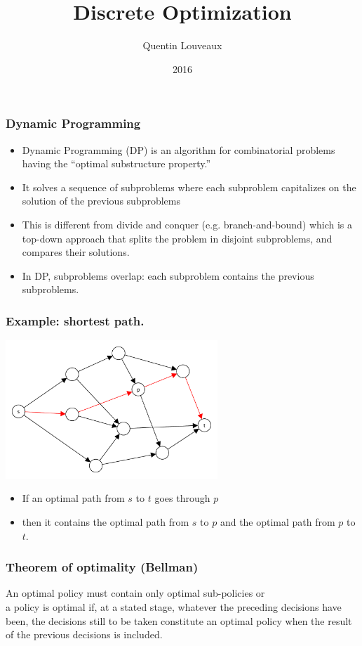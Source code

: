 \documentclass[10pt,handout]{beamer}
\title{Discrete Optimization}
\author{Quentin
Louveaux}
\date{2016}
\institute{ULg - Institut Montefiore}
\begin{document}
\begin{frame}
  \titlepage
\end{frame}
\begin{frame} \frametitle{Dynamic Programming}
  \begin{itemize}
  \item Dynamic Programming (DP) is an algorithm for combinatorial
    problems having the ``optimal substructure property.''
  \item It solves a sequence of \alert{subproblems} where each subproblem \alert{capitalizes} on
    the solution of the previous subproblems
  \item This is different from divide and conquer
    (e.g. branch-and-bound) which is a top-down approach that splits the
    problem in disjoint subproblems, and compares their solutions.
  \item In DP, subproblems overlap: each subproblem \alert{contains} the previous subproblems.
  \end{itemize}
\end{frame}

\begin{frame} \frametitle{Example: shortest path.}
  \begin{center}
    \includegraphics[width=0.6\textwidth]{SP.pdf}
  \end{center}


        \begin{itemize}
        \item If an optimal path from $s$ to $t$ goes through $p$
        \item then it contains the optimal path from $s$ to $p$ and the optimal path from $p$ to $t$.
        \end{itemize}

\end{frame}

\begin{frame} \frametitle{Theorem of optimality (Bellman)}
  \begin{center}
    \alert{An optimal policy}
      must contain only optimal sub-policies
    or \\ [10mm]
    a policy is optimal if, at a stated stage, whatever the
      preceding decisions have been, the decisions still to be taken
      constitute an optimal policy when the result of the previous
      decisions is included.
  \end{center}
\end{frame}
\end{document}
